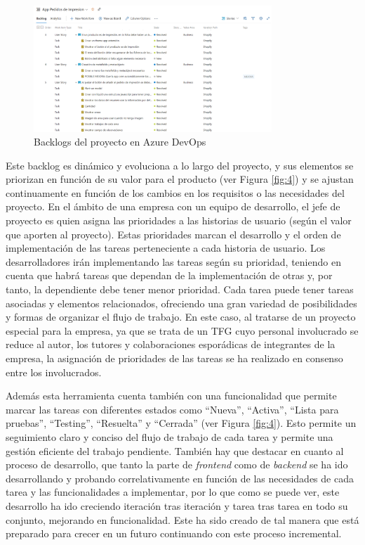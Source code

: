 \documentclass[11pt]{article}
\begin{document}
\begin{figure}[H]
    \centering
    \includegraphics[width=0.8\textwidth]{imagenes/Backlogs de Devops.png}
    \caption{\label{fig:3}Backlogs del proyecto en Azure DevOps}
    \vspace{\fill}
\end{figure}

Este backlog es dinámico y evoluciona a lo largo del proyecto, y sus elementos se priorizan en función de su valor para el 
producto (ver Figura \ref{fig:4}) y se ajustan continuamente en función de los cambios en los requisitos o las necesidades del proyecto. En el ámbito de una empresa con
un equipo de desarrollo, el jefe de proyecto es quien asigna las prioridades a las historias de usuario (según el valor que aporten al proyecto). Estas prioridades marcan
el desarrollo y el orden de implementación de las tareas perteneciente a cada historia de usuario. Los desarrolladores irán implementando las tareas según su prioridad, 
teniendo en cuenta que habrá tareas que dependan de la implementación de otras y, por tanto, la dependiente debe tener menor prioridad.
Cada tarea puede tener tareas asociadas y elementos relacionados, ofreciendo una gran variedad de posibilidades y formas de organizar el flujo de trabajo. 
En este caso, al tratarse de un proyecto especial para la empresa, ya que se trata de un TFG 
cuyo personal involucrado se reduce al autor, los tutores y colaboraciones esporádicas de integrantes de la empresa, la asignación de prioridades 
de las tareas se ha realizado en consenso entre los involucrados.

Además esta herramienta cuenta también con una funcionalidad que permite marcar las tareas con diferentes estados como ``Nueva'', ``Activa'', ``Lista para pruebas'', ``Testing'', ``Resuelta'' y ``Cerrada'' (ver Figura \ref{fig:4}). Esto permite un seguimiento claro y conciso del flujo de trabajo de cada tarea
y permite una gestión eficiente del trabajo pendiente. También hay que destacar en cuanto al proceso de desarrollo, que tanto la parte de \textit{frontend} como de \textit{backend} se ha ido desarrollando y probando correlativamente en función de las necesidades de cada tarea y las funcionalidades a implementar, por lo que como se puede ver, 
este desarrollo ha ido creciendo iteración tras iteración y tarea tras tarea en todo su conjunto, mejorando en funcionalidad. Este ha sido creado de tal manera que está preparado para crecer en un futuro continuando con este proceso incremental.
\end{document}
